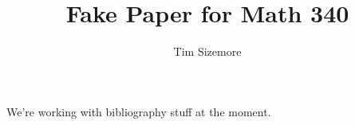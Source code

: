 \documentclass{article}
\begin{document}
\nocite{*}
\title{Fake Paper for Math 340}
\author{Tim Sizemore}

\maketitle

We're working with bibliography stuff at the moment.



\end{document}
